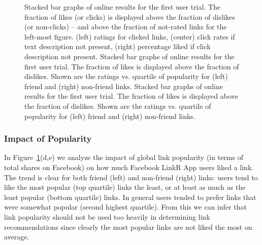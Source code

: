\begin{figure}[t!]
\caption{Stacked bar graphs of online results for the first 
user trial.  The fraction of likes (or clicks) is displayed above 
the fraction of dislikes (or non-clicks) -- and above the fraction of not-rated
links for the left-most figure.  
(left) ratings for clicked links, (center) click rates if
text description not present, 
(right) percentage liked if click description not present.
Stacked bar graphs of online results for the first 
user trial.  The fraction of likes is displayed above the fraction of
dislikes.  Shown are the ratings vs. quartile of popularity for (left)
friend and (right) non-friend links.
Stacked bar graphs of online results for the first 
user trial.  The fraction of likes is displayed above the fraction of
dislikes.  Shown are the ratings vs. quartile of popularity for (left)
friend and (right) non-friend links.
}
\label{fig:click_evidence}
\end{figure}

\subsubsection{Impact of Popularity}

In Figure~\ref{fig:click_evidence}(d,e) we analyze the impact of global link
popularity (in terms of total shares on Facebook) 
on how much Facebook LinkR App users liked a link.
The trend is clear for both friend (left) and non-friend (right)
links: users tend to like the most popular (top quartile) 
links the least, or at least as much as the least popular (bottom quartile)
links.  In general users tended to prefer links that were somewhat
popular (second highest quartile).  From this we can infer that
link popularity should not be used too heavily in determining link
recommendations since clearly the most popular links are not liked
the most on average.



